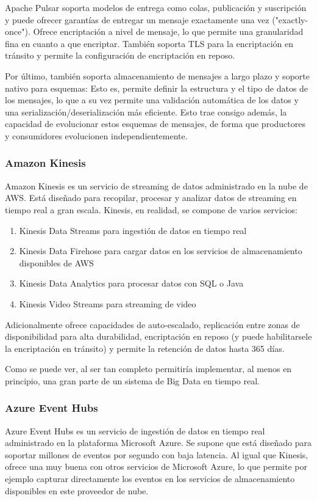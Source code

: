 Apache Pulsar soporta modelos de entrega como colas, publicación y suscripción y puede ofrecer garantías de entregar un mensaje 
exactamente una vez ("exactly-once"). Ofrece encriptación a nivel de mensaje, lo que permite una granularidad fina en cuanto a que encriptar. 
También soporta TLS para la encriptación en tránsito y permite la configuración de encriptación en reposo.

Por último, también soporta almacenamiento de mensajes a largo plazo y soporte nativo para esquemas:
Esto es, permite definir la estructura y el tipo de datos de los mensajes, lo que a su vez permite una validación automática de los datos 
y una serialización/deserialización más eficiente. Esto trae consigo además, la capacidad de evolucionar estos esquemas de mensajes,
de forma que productores y consumidores evolucionen independientemente.

\subsubsection{Amazon Kinesis}
Amazon Kinesis es un servicio de streaming de datos administrado en la nube de AWS. 
Está diseñado para recopilar, procesar y analizar datos de streaming en tiempo real a gran escala.
Kinesis, en realidad, se compone de varios servicios:
\begin{enumerate}
    \item Kinesis Data Streams para ingestión de datos en tiempo real
    \item Kinesis Data Firehose para cargar datos en los servicios de almacenamiento disponibles de AWS
    \item Kinesis Data Analytics para procesar datos con SQL o Java
    \item Kinesis Video Streams para streaming de video  
\end{enumerate}
Adicionalmente ofrece capacidades de auto-escalado, replicación entre zonas de disponibilidad para alta durabilidad, encriptación en reposo 
(y puede habilitarsele la encriptación en tránsito) y permite la retención de datos hasta 365 días.

Como se puede ver, al ser tan completo permitiría implementar, al menos en principio, una gran parte de un sistema de Big Data en tiempo real.

\subsubsection{Azure Event Hubs}
Azure Event Hubs es un servicio de ingestión de datos en tiempo real administrado en la plataforma Microsoft Azure.
Se supone que está diseñado para soportar millones de eventos por segundo con baja latencia. Al igual que Kinesis,
ofrece una muy buena con otros servicios de Microsoft Azure, lo que permite por ejemplo capturar directamente los eventos
en los servicios de almacenamiento disponibles en este proveedor de nube.

